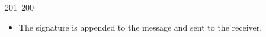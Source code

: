 201~200~\documentclass{article}
\begin{document}
\begin{itemize}
	                                                                                                                                                                                                                                                                                                	                                                                                                                                        	    	                                                                                                	                                                                                                                                                                                                                                                                                                                                	                                                                        	                                                                        	                                                                                                                                        	                                                                                                                                                                                                                        	                                                                                                                            	                                                                	                                                                        \item The signature is appended to the message and sent to the receiver.

\end{itemize}
\end{document}
